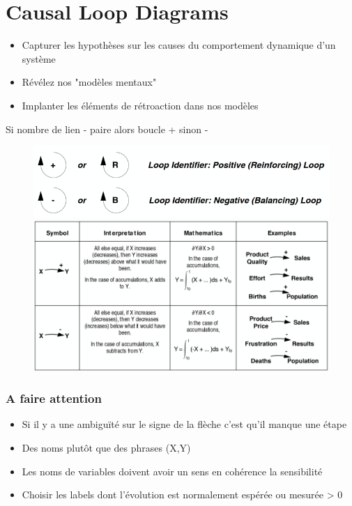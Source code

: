\documentclass[resume]{subfiles}
\begin{document}
\section{Causal Loop Diagrams}
\begin{itemize}
\item Capturer les hypothèses sur les causes du
  comportement dynamique d'un système
\item Révélez nos "modèles mentaux"
\item Implanter les éléments de rétroaction dans nos modèles  
\end{itemize}

Si nombre de lien - paire alors boucle + sinon -
\begin{figure}[H]
    \centering
    \includegraphics[width=0.8\columnwidth]{Figures/CLD_1.PNG}
    \includegraphics[width=0.8\columnwidth]{Figures/CLD_2.PNG}
\end{figure}

\subsubsection{A faire attention}
\begin{itemize}
\item Si il y a une ambiguïté sur le signe de la flèche c'est qu'il manque une étape
\item Des noms plutôt que des phrases (X,Y)
\item Les noms de variables doivent avoir un sens en
  cohérence la sensibilité
\item Choisir les labels dont l'évolution est normalement
  espérée ou mesurée > 0
\end{itemize}
\end{document}
